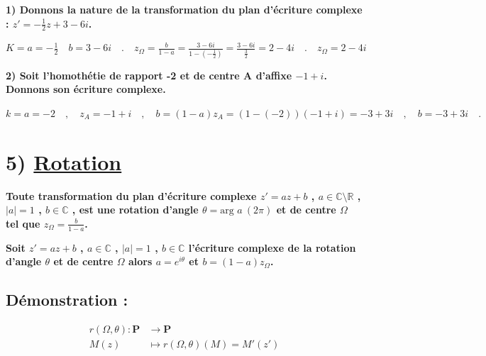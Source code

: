 \documentclass[12pt,a4paper]{article}
\begin{document}
\textbf{1) Donnons la nature de la transformation du plan d'écriture complexe : $z' = -\frac{1}{2} z + 3 - 6i$.}

$K = a = -\frac{1}{2} \quad b = 3 - 6i \quad . \quad z_{\Omega} = \frac{b}{1 - a} = \frac{3 - 6i}{1 - (-\frac{1}{2})} = \frac{3 - 6i}{\frac{3}{2}} = 2 - 4i \quad . \quad z_{\Omega} = 2 - 4i$

\begin{center}
\end{center}

\textbf{2) Soit l'homothétie de rapport -2 et de centre A d'affixe $-1 + i$. Donnons son écriture complexe.}

$k = a = -2 \quad , \quad z_A = -1 + i \quad , \quad b = (1 - a) z_A = (1 - (-2))(-1 + i) = -3 + 3i \quad , \quad b = -3 + 3i \quad .$

\begin{center}
\end{center}

\section*{5) \underline{Rotation}}

\textbf{Toute transformation du plan d'écriture complexe $z' = a z + b$ , $a \in \mathbb{C} \setminus \mathbb{R}$ , $|a| = 1$ , $b \in \mathbb{C}$ , est une rotation d'angle $\theta = \text{arg } a \ (2\pi)$ et de centre $\Omega$ tel que $z_{\Omega} = \frac{b}{1 - a}$.}


 \textbf{Soit $z' = a z + b$ , $a \in \mathbb{C}$ , $|a| = 1$ , $b \in \mathbb{C}$ l'écriture complexe de la rotation d'angle $\theta$ et de centre $\Omega$ alors $a = e^{i\theta}$ et $b = (1 - a) z_{\Omega}$.}
\subsection*{Démonstration :}
$$
                \begin{aligned}
                r(\Omega, \theta) : \boldsymbol{P} &\longrightarrow \boldsymbol{P}\\M(z) &\longmapsto
                r(\Omega,\theta)(M) =
                M'(z')
                \end{aligned}
                $$
\end{document}
